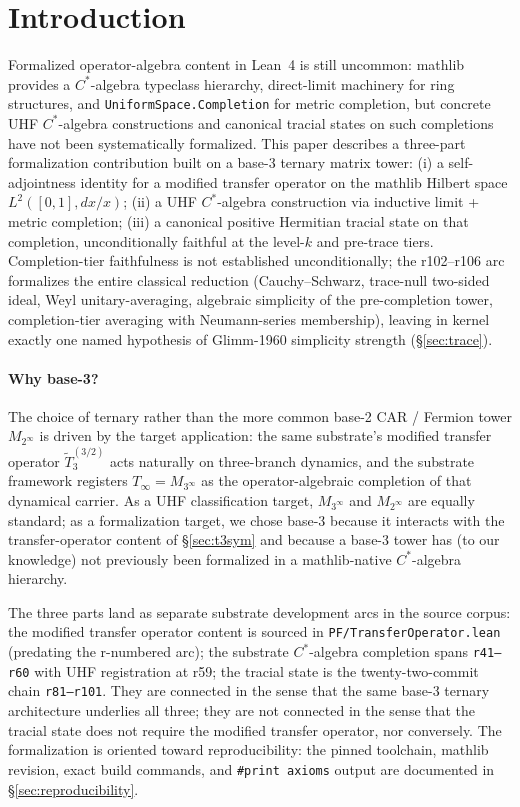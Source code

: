 \documentclass[11pt,a4paper]{amsart}
\theoremstyle{plain}
\theoremstyle{definition}
\begin{document}
\section{Introduction}\label{sec:intro}

Formalized operator-algebra content in Lean~4 is still uncommon: mathlib provides a $C^*$-algebra typeclass hierarchy, direct-limit machinery for ring structures, and \texttt{UniformSpace.Completion} for metric completion, but concrete UHF $C^*$-algebra constructions and canonical tracial states on such completions have not been systematically formalized. This paper describes a three-part formalization contribution built on a base-3 ternary matrix tower: (i) a self-adjointness identity for a modified transfer operator on the mathlib Hilbert space $L^2([0,1], dx/x)$; (ii) a UHF $C^*$-algebra construction via inductive limit + metric completion; (iii) a canonical positive Hermitian tracial state on that completion, unconditionally faithful at the level-$k$ and pre-trace tiers. Completion-tier faithfulness is not established unconditionally; the r102--r106 arc formalizes the entire classical reduction (Cauchy--Schwarz, trace-null two-sided ideal, Weyl unitary-averaging, algebraic simplicity of the pre-completion tower, completion-tier averaging with Neumann-series membership), leaving in kernel exactly one named hypothesis of Glimm-1960 simplicity strength (\S\ref{sec:trace}).

\paragraph{Why base-3?} The choice of ternary rather than the more common base-2 CAR / Fermion tower $M_{2^\infty}$ is driven by the target application: the same substrate's modified transfer operator $\widetilde{T}_3^{(3/2)}$ acts naturally on three-branch dynamics, and the substrate framework registers $T_\infty = M_{3^\infty}$ as the operator-algebraic completion of that dynamical carrier. As a UHF classification target, $M_{3^\infty}$ and $M_{2^\infty}$ are equally standard; as a formalization target, we chose base-3 because it interacts with the transfer-operator content of \S\ref{sec:t3sym} and because a base-3 tower has (to our knowledge) not previously been formalized in a mathlib-native $C^*$-algebra hierarchy.

The three parts land as separate substrate development arcs in the source corpus: the modified transfer operator content is sourced in \texttt{PF/TransferOperator.lean} (predating the r-numbered arc); the substrate $C^*$-algebra completion spans \texttt{r41--r60} with UHF registration at r59; the tracial state is the twenty-two-commit chain \texttt{r81--r101}. They are connected in the sense that the same base-3 ternary architecture underlies all three; they are not connected in the sense that the tracial state does not require the modified transfer operator, nor conversely. The formalization is oriented toward reproducibility: the pinned toolchain, mathlib revision, exact build commands, and \texttt{\#print axioms} output are documented in \S\ref{sec:reproducibility}.
\end{document}

